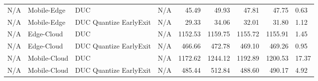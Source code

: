 \begin{tabular}{|l|l|l|l|r|r|r|r|}
N/A & Mobile-Edge & DUC & N/A & 45.49 & 49.93 & 47.81 & 47.75 & 0.63 \\
N/A & Mobile-Edge & DUC Quantize EarlyExit & N/A & 29.33 & 34.06 & 32.01 & 31.80 & 1.12 \\
N/A & Edge-Cloud & DUC & N/A & 1152.53 & 1159.75 & 1155.72 & 1155.91 & 1.45 \\
N/A & Edge-Cloud & DUC Quantize EarlyExit & N/A & 466.66 & 472.78 & 469.10 & 469.26 & 0.95 \\
N/A & Mobile-Cloud & DUC & N/A & 1172.62 & 1244.12 & 1192.89 & 1200.53 & 17.37 \\
N/A & Mobile-Cloud & DUC Quantize EarlyExit & N/A & 485.44 & 512.84 & 488.60 & 490.17 & 4.92 \\
\hline
\end{tabular}